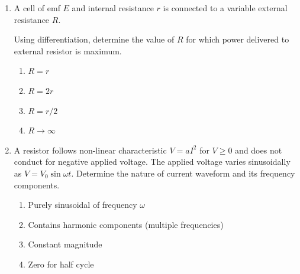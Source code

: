 \documentclass[12pt]{article}
\begin{document}
\begin{enumerate}
Assuming resistivity remains constant, derive the new resistance.

\begin{enumerate}[label=\Alph*)]
\item $2R$
\item $4R$
\item $8R$
\item $R/2$
\end{enumerate}

\item A cell of emf $E$ and internal resistance $r$ is connected to a variable external resistance $R$.

Using differentiation, determine the value of $R$ for which power delivered to external resistor is maximum.

\begin{enumerate}[label=\Alph*)]
\item $R = r$
\item $R = 2r$
\item $R = r/2$
\item $R \to \infty$
\end{enumerate}

\item A resistor follows non-linear characteristic $V = aI^2$ for $V \ge 0$ and does not conduct for negative applied voltage. The applied voltage varies sinusoidally as $V = V_0 \sin \omega t$.
Determine the nature of current waveform and its frequency components.

\begin{center}
\end{center}

\begin{enumerate}[label=\Alph*)]
\item Purely sinusoidal of frequency $\omega$
\item Contains harmonic components (multiple frequencies)
\item Constant magnitude
\item Zero for half cycle
\end{enumerate}


\end{enumerate}
\end{document}
